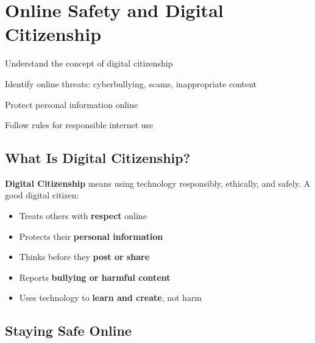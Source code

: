 \chapter{Online Safety and Digital Citizenship}
\label{ch:safety}

\begin{objectives}
  \item Understand the concept of digital citizenship
  \item Identify online threats: cyberbullying, scams, inappropriate content
  \item Protect personal information online
  \item Follow rules for responsible internet use
\end{objectives}


\section{What Is Digital Citizenship?}
\label{sec:digital-citizen}

\begin{theorybox}
\textbf{Digital Citizenship} means using technology responsibly, ethically, and safely. A good digital citizen:
\begin{itemize}[leftmargin=*, label={\textcolor{LabGreen}{}}, itemsep=2pt]
  \item Treats others with \textbf{respect} online
  \item Protects their \textbf{personal information}
  \item Thinks before they \textbf{post or share}
  \item Reports \textbf{bullying or harmful content}
  \item Uses technology to \textbf{learn and create}, not harm
\end{itemize}
\end{theorybox}

\section{Staying Safe Online}
\label{sec:stay-safe}

